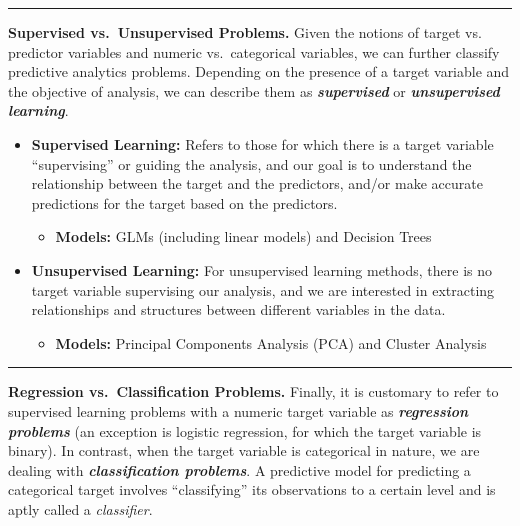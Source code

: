 \documentclass[
  12pt,
]{krantz}
\providecommand{\tightlist}{%
  \setlength{\itemsep}{0pt}\setlength{\parskip}{0pt}}
\begin{document}
\begin{center}\rule{0.5\linewidth}{0.5pt}\end{center}

\textbf{Supervised vs.~Unsupervised Problems.} Given the notions of target vs.
predictor variables and numeric vs.~categorical variables, we can further
classify predictive analytics problems. Depending on the presence of a target
variable and the objective of analysis, we can describe them as \textbf{\emph{supervised}}
or \textbf{\emph{unsupervised learning}}.

\begin{itemize}
\tightlist
\item
  \textbf{Supervised Learning:} Refers to those for which there is a target
  variable ``supervising'' or guiding the analysis, and our goal is to
  understand the relationship between the target and the predictors, and/or
  make accurate predictions for the target based on the predictors.

  \begin{itemize}
  \item
    \textbf{Models:} GLMs (including linear models) and Decision Trees
  \end{itemize}
\item
  \textbf{Unsupervised Learning:} For unsupervised learning methods, there is no
  target variable supervising our analysis, and we are interested in
  extracting relationships and structures between different variables in the
  data.

  \begin{itemize}
  \item
    \textbf{Models:} Principal Components Analysis (PCA) and Cluster Analysis
  \end{itemize}
\end{itemize}

\begin{center}\rule{0.5\linewidth}{0.5pt}\end{center}

\textbf{Regression vs.~Classification Problems.} Finally, it is customary to refer to
supervised learning problems with a numeric target variable as \textbf{\emph{regression
problems}} (an exception is logistic regression, for which the target variable
is binary). In contrast, when the target variable is categorical in nature, we
are dealing with \textbf{\emph{classification problems}}. A predictive model for
predicting a categorical target involves ``classifying'' its observations to a
certain level and is aptly called a \emph{classifier}.
\end{document}

